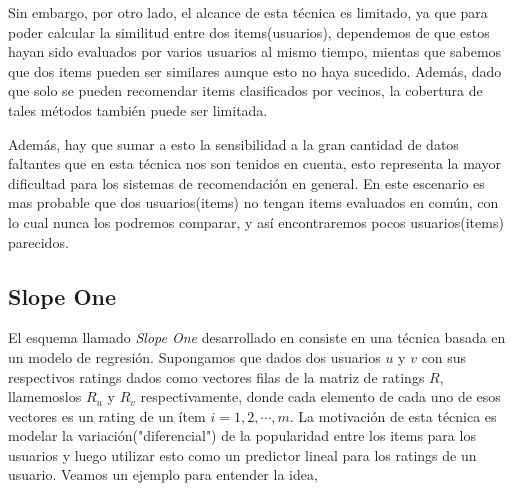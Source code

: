 \documentclass[hidelinks,12pt,a4paper]{book}
\theoremstyle{plain}
\theoremstyle{definition}
\begin{document}
Sin embargo, por otro lado, el alcance de esta técnica es limitado, ya que para poder calcular la similitud entre dos items(usuarios), dependemos de que estos hayan sido evaluados por varios usuarios al mismo tiempo, mientas que sabemos que dos items pueden ser similares aunque esto no haya sucedido. Además, dado que solo se pueden recomendar items clasificados por vecinos, la cobertura de tales métodos también puede ser limitada.

Además, hay que sumar a esto la sensibilidad a la gran cantidad de datos faltantes que en esta técnica nos son tenidos en cuenta, esto representa la mayor dificultad para los sistemas de recomendación en general. En este escenario es mas probable que dos usuarios(items) no tengan items evaluados en común, con lo cual nunca los podremos comparar, y así encontraremos pocos usuarios(items) parecidos.

\subsection{Slope One}

El esquema llamado \textit{Slope One} desarrollado en \cite{slope} consiste en una técnica basada en un modelo de regresión. Supongamos que dados dos usuarios $u$ y $v$ con sus respectivos ratings dados como vectores filas de la matriz de ratings $R$, llamemoslos $R_u$ y $R_v$ respectivamente, donde cada elemento de cada uno de esos vectores es un rating de un ítem $i=1,2,\cdots,m$. La motivación de esta técnica es modelar la variación("diferencial") de la popularidad entre los items para los usuarios y luego utilizar esto como un predictor lineal para los ratings de un usuario. Veamos un ejemplo para entender la idea,
\end{document}
